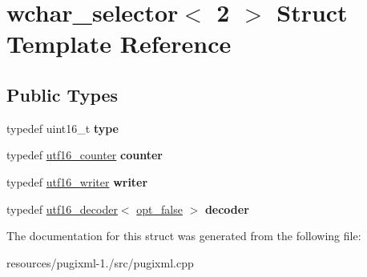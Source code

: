 \hypertarget{structwchar__selector_3_012_01_4}{\section{wchar\+\_\+selector$<$ 2 $>$ Struct Template Reference}
\label{structwchar__selector_3_012_01_4}
}
\subsection*{Public Types}
\begin{DoxyCompactItemize}
\item 
\hypertarget{structwchar__selector_3_012_01_4_a60517f9b159ad60977ca7c3d2739c168}{typedef uint16\+\_\+t {\bfseries type}}\label{structwchar__selector_3_012_01_4_a60517f9b159ad60977ca7c3d2739c168}

\item 
\hypertarget{structwchar__selector_3_012_01_4_a108682c81b16127f3bec2501f02cb9d8}{typedef \hyperlink{structutf16__counter}{utf16\+\_\+counter} {\bfseries counter}}\label{structwchar__selector_3_012_01_4_a108682c81b16127f3bec2501f02cb9d8}

\item 
\hypertarget{structwchar__selector_3_012_01_4_af84979f9b8cd883798fe4e99820d6073}{typedef \hyperlink{structutf16__writer}{utf16\+\_\+writer} {\bfseries writer}}\label{structwchar__selector_3_012_01_4_af84979f9b8cd883798fe4e99820d6073}

\item 
\hypertarget{structwchar__selector_3_012_01_4_a74001138c16e29a1892b903b8778760b}{typedef \hyperlink{structutf16__decoder}{utf16\+\_\+decoder}$<$ \hyperlink{structopt__false}{opt\+\_\+false} $>$ {\bfseries decoder}}\label{structwchar__selector_3_012_01_4_a74001138c16e29a1892b903b8778760b}

\end{DoxyCompactItemize}


The documentation for this struct was generated from the following file\+:\begin{DoxyCompactItemize}
\item 
resources/pugixml-\/1./src/pugixml.\+cpp\end{DoxyCompactItemize}
